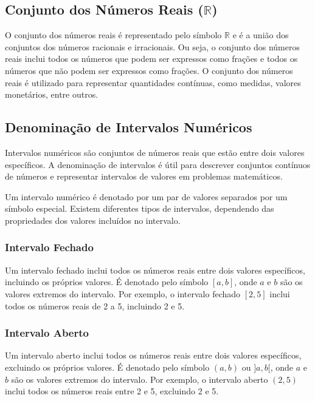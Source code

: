 \documentclass[12pt]{article}
\begin{document}
\subsection{Conjunto dos Números Reais (\texorpdfstring{$\mathbb{R}$}{R})}

O conjunto dos números reais é representado pelo símbolo $\mathbb{R}$ e é a união dos conjuntos dos números racionais e irracionais. Ou seja, o conjunto dos números reais inclui todos os números que podem ser expressos como frações e todos os números que não podem ser expressos como frações. O conjunto dos números reais é utilizado para representar quantidades contínuas, como medidas, valores monetários, entre outros.


\subsection{Denominação de Intervalos Numéricos}

Intervalos numéricos são conjuntos de números reais que estão entre dois valores específicos. A denominação de intervalos é útil para descrever conjuntos contínuos de números e representar intervalos de valores em problemas matemáticos.

Um intervalo numérico é denotado por um par de valores separados por um símbolo especial. Existem diferentes tipos de intervalos, dependendo das propriedades dos valores incluídos no intervalo.

\pagebreak
\subsubsection{Intervalo Fechado}

Um intervalo fechado inclui todos os números reais entre dois valores específicos, incluindo os próprios valores. É denotado pelo símbolo $[a, b]$, onde $a$ e $b$ são os valores extremos do intervalo. Por exemplo, o intervalo fechado $[2, 5]$ inclui todos os números reais de 2 a 5, incluindo 2 e 5.

\subsubsection{Intervalo Aberto}

Um intervalo aberto inclui todos os números reais entre dois valores específicos, excluindo os próprios valores. É denotado pelo símbolo $(a, b)$ ou $]a, b[$, onde $a$ e $b$ são os valores extremos do intervalo. Por exemplo, o intervalo aberto $(2, 5)$ inclui todos os números reais entre 2 e 5, excluindo 2 e 5.
\end{document}
